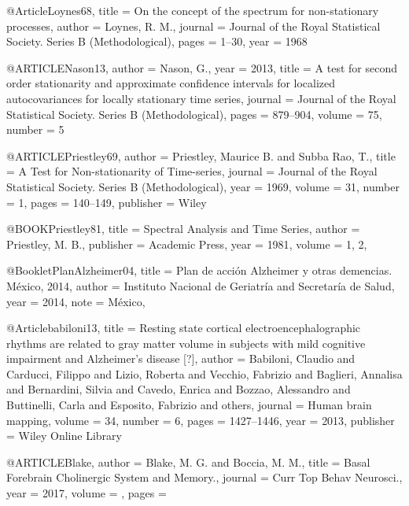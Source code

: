 @Article{Loynes68,
    title =   {On the concept of the spectrum for non-stationary processes},
    author =  {Loynes, R. M.},
    journal = {Journal of the Royal Statistical Society. Series B (Methodological)},
    pages =   {1--30},
    year =    {1968}
}

@ARTICLE{Nason13,
    author =  {Nason, G.},
    year =    {2013},
    title =   {A test for second order stationarity and approximate confidence intervals for 
               localized autocovariances for locally stationary time series},
    journal = {Journal of the Royal Statistical Society. Series B (Methodological)},
    pages =   {879--904},
    volume =  {75},
    number =  {5}
}

@ARTICLE{Priestley69,
    author =  {Priestley, Maurice B. 
               and Subba Rao, T.},
    title =   {A {T}est for {N}on-stationarity of {T}ime-series},
    journal = {Journal of the {R}oyal {S}tatistical {S}ociety. {S}eries {B} ({M}ethodological)},
    year =    {1969},
    volume =  {31},
    number =  {1},
    pages =   {140--149},
    publisher = {Wiley}
}

@BOOK{Priestley81,
   title =     {Spectral Analysis and Time Series},
   author =    {Priestley, M. B.},
   publisher = {Academic Press},
   year =      {1981},
   volume =    {1, 2},
}

@Booklet{PlanAlzheimer04,
    title =  {Plan de acción Alzheimer y otras demencias. M\'exico, 2014},
    author = {{Instituto Nacional de Geriatr\'ia} 
    		  and {Secretar\'ia de Salud}},
    year =   {2014},
    note =   {M\'exico},
}

@Article{babiloni13,
    title   = {Resting state cortical electroencephalographic rhythms are related to gray matter 
               volume in subjects with mild cognitive impairment and {Alzheimer's} disease [?]},
    author  = {Babiloni, Claudio 
               and Carducci, Filippo 
               and Lizio, Roberta 
               and Vecchio, Fabrizio 
               and Baglieri, Annalisa 
               and Bernardini, Silvia 
               and Cavedo, Enrica 
               and Bozzao, Alessandro 
               and Buttinelli, Carla 
               and Esposito, Fabrizio 
               and others},
    journal = {Human brain mapping},
    volume  = {34},
    number  = {6},
    pages   = {1427--1446},
    year    = {2013},
    publisher = {Wiley Online Library}
}

@ARTICLE{Blake,
author = {Blake, M. G. and Boccia, M. M.},
title = {Basal Forebrain Cholinergic System and Memory.},
journal = {Curr Top Behav Neurosci.},
year = {2017},
volume = { },
pages = { }
}

